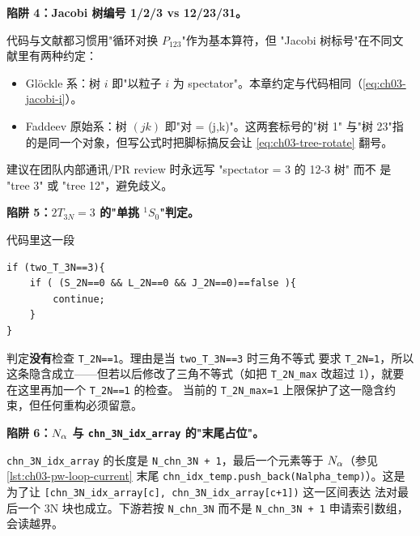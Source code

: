 \begin{pitfallbox}
\textbf{陷阱 4：Jacobi 树编号 1/2/3 vs 12/23/31。}

代码与文献都习惯用"循环对换 \(P_{123}\)"作为基本算符，但
"Jacobi 树标号"在不同文献里有两种约定：
\begin{itemize}
  \item Glöckle 系：树 \(i\) 即"以粒子 \(i\) 为 spectator"。本章约定与代码相同（\cref{eq:ch03-jacobi-i}）。
  \item Faddeev 原始系：树 \((jk)\) 即"对 = (j,k)"。这两套标号的"树 1"
        与"树 23"指的是同一个对象，但写公式时把脚标搞反会让
        \cref{eq:ch03-tree-rotate} 翻号。
\end{itemize}
建议在团队内部通讯/PR review 时永远写 "spectator = 3 的 12-3 树" 而不
是 "tree 3" 或 "tree 12"，避免歧义。
\end{pitfallbox}

\begin{pitfallbox}
\textbf{陷阱 5：\(2T_{3N} = 3\) 的"单挑 \({}^1S_0\)"判定。}

代码里这一段
\begin{lstlisting}[style=cpp,frame=none,numbers=none]
if (two_T_3N==3){
    if ( (S_2N==0 && L_2N==0 && J_2N==0)==false ){
        continue;
    }
}
\end{lstlisting}
判定\textbf{没有}检查 \verb|T_2N==1|。理由是当 \verb|two_T_3N==3| 时三角不等式
要求 \verb|T_2N=1|，所以这条隐含成立——但若以后修改了三角不等式（如把
\verb|T_2N_max| 改超过 1），就要在这里再加一个 \verb|T_2N==1| 的检查。
当前的 \verb|T_2N_max=1| 上限保护了这一隐含约束，但任何重构必须留意。
\end{pitfallbox}

\begin{pitfallbox}
\textbf{陷阱 6：\(N_\alpha\) 与 \texttt{chn\_3N\_idx\_array} 的"末尾占位"。}

\texttt{chn\_3N\_idx\_array} 的长度是 \verb|N_chn_3N + 1|，最后一个元素等于
\(N_\alpha\)（参见 \cref{lst:ch03-pw-loop-current} 末尾
\verb|chn_idx_temp.push_back(Nalpha_temp)|）。这是为了让
\verb|[chn_3N_idx_array[c], chn_3N_idx_array[c+1])| 这一区间表达
法对最后一个 3N 块也成立。下游若按 \verb|N_chn_3N| 而不是
\verb|N_chn_3N + 1| 申请索引数组，会读越界。
\end{pitfallbox}

